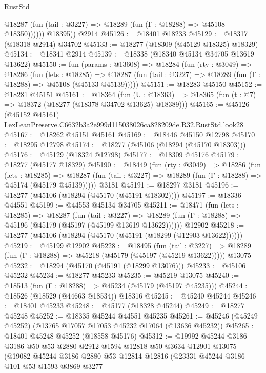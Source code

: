 \begin{lexlean}{RustStd}
\begin{coremodule}
              @18287 (fun (tail : @3227) => @18289 (fun (Γ : @18288) => @45108 @18350))))))
        @18395))
    @2914
@45126 := @18401 @18233
@45129 := @18317 (@18318 @2914) @34702
@45133 := @18277 (@18309 (@45129 @18325) @18329)
@45134 := @18341 @2914
@45139 := @18338 (@18340 @45134 @34705 @13619 @13622)
@45150 := fun (params : @13608) =>
  @18284
    (fun (rty : @3049) =>
    @18286
      (fun (lets : @18285) =>
      @18287 (fun (tail : @3227) => @18289 (fun (Γ : @18288) => @45108 (@45133 @45139)))))
@45151 := @18283 @45150
@45152 := @18281 @45151
@45161 := @18364
    (fun (U : @18363) => @18365 (fun (t : @7) => @18372 (@18277 (@18378 @34702 @13625) @18389)))
@45165 := @45126
    (@45152 @45161)
    LexLeanPreserve.C6632b3a2e999d115038026ca828209de.R32.RustStd.look28
@45167 := @18262 @45151 @45161
@45169 := @18446 @45150 @12798
@45170 := @18295 @12798
@45174 := @18277 (@45106 (@18294 (@45170 @18303)))
@45176 := @45129 (@18324 @12798)
@45177 := @18309 @45176
@45179 := @18277 (@45177 @18329)
@45190 := @18449
    (fun (rty : @3049) =>
    @18286
      (fun (lets : @18285) =>
      @18287 (fun (tail : @3227) => @18289 (fun (Γ : @18288) => @45174 (@45179 @45139)))))
    @3181
@45191 := @18297 @3181
@45196 := @18277 (@45106 (@18294 (@45170 (@45191 @18302))))
@45197 := @18336 @44551
@45199 := @44553 @45134 @34705
@45211 := @18471
    (fun (lets : @18285) =>
    @18287
      (fun (tail : @3227) =>
      @18289 (fun (Γ : @18288) => @45196 (@45179 (@45197 (@45199 @13619 @13622))))))
    @12902
@45218 := @18277 (@45106 (@18294 (@45170 (@45191 (@18299 (@12903 @13622))))))
@45219 := @45199 @12902
@45228 := @18495
    (fun (tail : @3227) => @18289 (fun (Γ : @18288) => @45218 (@45179 (@45197 (@45219 @13622)))))
    @13075
@45232 := @18294 (@45170 (@45191 (@18299 @13076)))
@45233 := @45106 @45232
@45234 := @18277 @45233
@45235 := @45219 @13075
@45240 := @18513 (fun (Γ : @18288) => @45234 (@45179 (@45197 @45235)))
@45244 := @18526 (@18529 (@44663 @18534)) @18316
@45245 := @45240 @45244
@45246 := @18401 @45233
@45248 := @45177 (@18328 @45244)
@45249 := @18277 @45248
@45252 := @18335 @45244 @44551 @45235
@45261 := @45246 (@45249 @45252) (@13765 @17057 @17053 @45232 @17064 (@13636 @45232))
@45265 := @18401 @45248 @45252 (@18558 @45176)
@45312 := @19992
    @45244
    @3186
    @3186
    @50
    @53
    @2880
    @2912
    @1594
    @12818
    @50
    @3634
    @12901
    @13075
    (@19082
      @45244
      @3186
      @2880
      @53
      @12814
      @12816
      (@23331
        @45244
        @3186
        @101
        @53
        @1593
        @3869
        @3277

\end{coremodule}
\end{lexlean}
